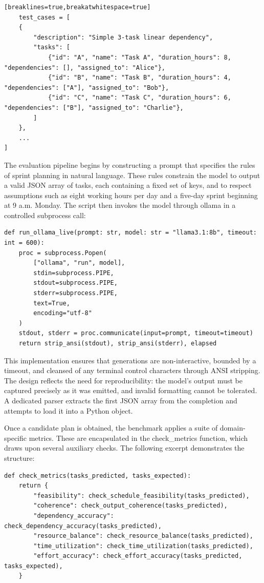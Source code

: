 \documentclass{report}
\begin{document}
\begin{lstlisting}[style=pythonstyle][breaklines=true,breakatwhitespace=true]
    test_cases = [
    {
        "description": "Simple 3-task linear dependency",
        "tasks": [
            {"id": "A", "name": "Task A", "duration_hours": 8, "dependencies": [], "assigned_to": "Alice"},
            {"id": "B", "name": "Task B", "duration_hours": 4, "dependencies": ["A"], "assigned_to": "Bob"},
            {"id": "C", "name": "Task C", "duration_hours": 6, "dependencies": ["B"], "assigned_to": "Charlie"},
        ]
    },
    ...
]
\end{lstlisting}

The evaluation pipeline begins by constructing a prompt that specifies the rules of sprint planning in natural language.
These rules constrain the model to output a valid JSON array of tasks, each containing a fixed set of keys, and to respect assumptions such as eight working hours per day and a five-day sprint beginning at 9 a.m. Monday.
The script then invokes the model through ollama in a controlled subprocess call:

\begin{lstlisting}[style=pythonstyle]
    def run_ollama_live(prompt: str, model: str = "llama3.1:8b", timeout: int = 600):
    proc = subprocess.Popen(
        ["ollama", "run", model],
        stdin=subprocess.PIPE,
        stdout=subprocess.PIPE,
        stderr=subprocess.PIPE,
        text=True,
        encoding="utf-8"
    )
    stdout, stderr = proc.communicate(input=prompt, timeout=timeout)
    return strip_ansi(stdout), strip_ansi(stderr), elapsed

\end{lstlisting}

This implementation ensures that generations are non-interactive, bounded by a timeout, and cleansed of any terminal control characters through ANSI stripping.
The design reflects the need for reproducibility: the model's output must be captured precisely as it was emitted, and invalid formatting cannot be tolerated.
A dedicated parser extracts the first JSON array from the completion and attempts to load it into a Python object.

Once a candidate plan is obtained, the benchmark applies a suite of domain-specific metrics. 
These are encapsulated in the check\_metrics function, which draws upon several auxiliary checks. 
The following excerpt demonstrates the structure:

\begin{lstlisting}[style=pythonstyle]
    def check_metrics(tasks_predicted, tasks_expected):
    return {
        "feasibility": check_schedule_feasibility(tasks_predicted),
        "coherence": check_output_coherence(tasks_predicted),
        "dependency_accuracy": check_dependency_accuracy(tasks_predicted),
        "resource_balance": check_resource_balance(tasks_predicted),
        "time_utilization": check_time_utilization(tasks_predicted),
        "effort_accuracy": check_effort_accuracy(tasks_predicted, tasks_expected),
    }

\end{lstlisting}
\end{document}
